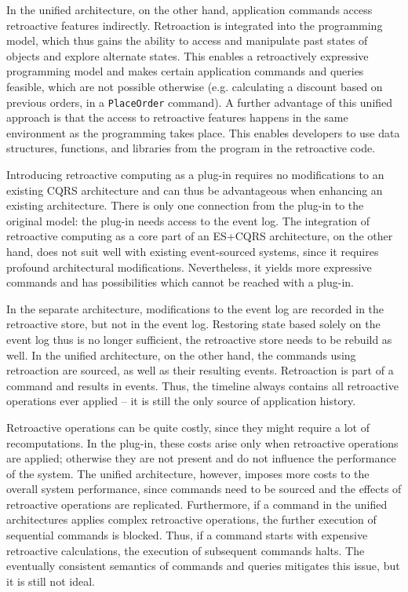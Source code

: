 In the unified architecture, on the other hand, application commands access 
retroactive features indirectly.
Retroaction is integrated into the programming model, which thus gains the 
ability to access and manipulate past states of objects and explore alternate 
states. This enables a retroactively expressive programming model and makes 
certain application commands and queries feasible, which are not possible 
otherwise (e.g. calculating a discount based on previous orders, in a 
\texttt{PlaceOrder} command).
A further advantage of this unified approach is that the access to retroactive
features happens in the same environment as the programming takes place.
This enables developers to use data structures, functions, and libraries from 
the program in the retroactive code.

Introducing retroactive computing as a plug-in requires no modifications to an 
existing CQRS architecture and can thus be advantageous when enhancing an 
existing architecture. There is only one connection from the plug-in to the 
original model: the plug-in needs access to the event log. The integration of 
retroactive computing as a core part of an ES+CQRS architecture, on the other 
hand, does not suit well with existing event-sourced systems, since it requires 
profound architectural modifications. 
Nevertheless, it yields more expressive commands and has possibilities which 
cannot be reached with a plug-in.

In the separate architecture, modifications to the event log are recorded in the 
retroactive store, but not in the event log. Restoring state based solely on the 
event log thus is no longer sufficient, the retroactive store needs to be rebuild 
as well. 
In the unified architecture, on the other hand, the commands using retroaction 
are sourced, as well as their resulting events. Retroaction is part of a command 
and results in events. Thus, the timeline always contains all retroactive 
operations ever applied -- it is still the only source of application history.

Retroactive operations can be quite costly, since they might require a lot of 
recomputations. In the plug-in, these costs arise only when retroactive operations 
are applied; otherwise they are not present and do not influence the performance
of the system. 
The unified architecture, however, imposes more costs to the overall system
performance, since commands need to be sourced and the effects of retroactive 
operations are replicated.
Furthermore, if a command in the unified architectures applies complex retroactive 
operations, the further execution of sequential commands is blocked. Thus, if a 
command starts with expensive retroactive calculations, the execution of subsequent 
commands halts. The eventually consistent semantics of commands and queries 
mitigates this issue, but it is still not ideal.

